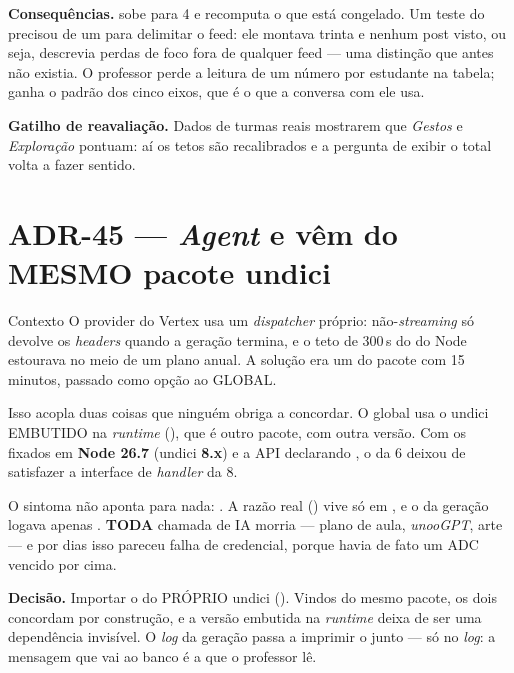 \textbf{Consequências.}  sobe para 4 e recomputa o que
está congelado. Um teste do  precisou de um
 para delimitar o feed: ele montava trinta  e nenhum
post visto, ou seja, descrevia perdas de foco fora de qualquer feed --- uma
distinção que antes não existia. O professor perde a leitura de um número por
estudante na tabela; ganha o padrão dos cinco eixos, que é o que a conversa com ele
usa.

\textbf{Gatilho de reavaliação.} Dados de turmas reais mostrarem que
\emph{Gestos} e \emph{Exploração} pontuam: aí os tetos são recalibrados e a
pergunta de exibir o total volta a fazer sentido.

\section{ADR-45 --- \emph{Agent} e  vêm do MESMO pacote undici}
\label{adr:undici-fetch}

\begin{especificacao}{Contexto}
O provider do Vertex usa um \emph{dispatcher} próprio: 
não-\emph{streaming} só devolve os \emph{headers} quando a geração termina, e o
teto de 300\,s do  do Node estourava no meio de um plano anual. A
solução era um  do pacote  com 15 minutos, passado como
opção  ao  GLOBAL.

Isso acopla duas coisas que ninguém obriga a concordar. O  global usa
o undici EMBUTIDO na \emph{runtime} (), que é outro
pacote, com outra versão. Com os  fixados em \textbf{Node 26.7}
(undici \textbf{8.x}) e a API declarando , o  da
6 deixou de satisfazer a interface de \emph{handler} da 8.

O sintoma não aponta para nada: . A razão real
() vive só em , e o  da
geração logava apenas . \textbf{TODA} chamada de IA morria ---
plano de aula, \emph{unooGPT}, arte --- e por dias isso pareceu falha de
credencial, porque havia de fato um ADC vencido por cima.
\end{especificacao}

\textbf{Decisão.} Importar o  do PRÓPRIO undici
(). Vindos do mesmo pacote, os dois
concordam por construção, e a versão embutida na \emph{runtime} deixa de ser
uma dependência invisível. O \emph{log} da geração passa a imprimir o
 junto --- só no \emph{log}: a mensagem que vai ao banco é a que o
professor lê.

